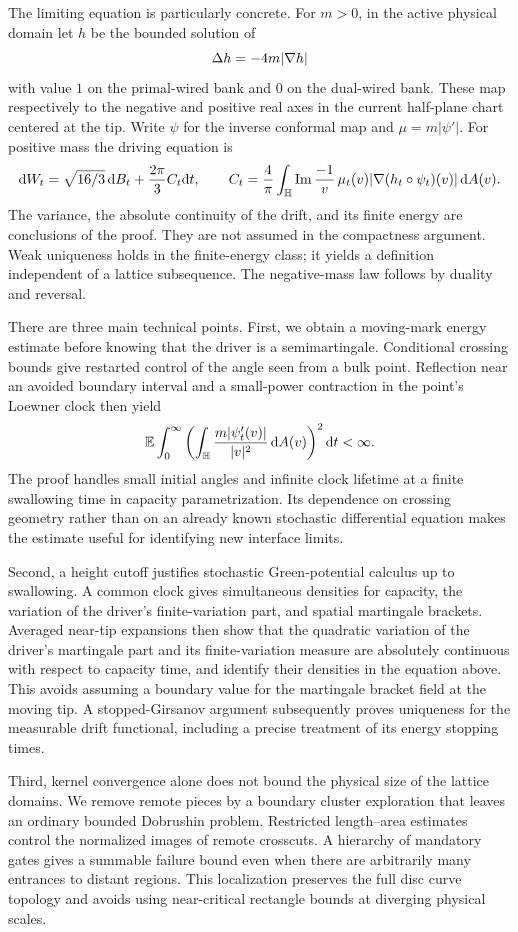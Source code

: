 The limiting equation is particularly concrete. For $m>0$, in the
active physical domain let $h$ be the bounded solution of
\[
 \Delta h=-4m|\nabla h|
\]
with value $1$ on the primal-wired bank and $0$ on the dual-wired
bank. These map respectively to the negative and positive real axes
in the current half-plane chart centered at the tip. Write $\psi$ for the
inverse conformal map and $\mu=m|\psi'|$. For positive mass the
driving equation is
\[
 \mathrm d W_t=\sqrt{16/3}\,\mathrm d B_t+\frac{2\pi}{3}C_t\mathrm d t,
 \qquad
 C_t=\frac4\pi\int_{\mathbb H}\operatorname{Im}\frac{-1}{v}\,
       \mu_t(v)|\nabla(h_t\circ\psi_t)(v)|\,\mathrm d A(v).
\]
The variance, the absolute continuity of the drift, and its finite
energy are conclusions of the proof. They are not assumed in the
compactness argument. Weak uniqueness holds in the finite-energy
class; it yields a definition independent of a lattice subsequence.
The negative-mass law follows by duality and reversal.

There are three main technical points. First, we obtain a
moving-mark energy estimate before knowing that the driver is a
semimartingale. Conditional crossing bounds give restarted control
of the angle seen from a bulk point. Reflection near an avoided
boundary interval and a small-power contraction in the point's
Loewner clock then yield
\[
 \mathbb E\int_0^\infty
   \left(\int_{\mathbb H}\frac{m|\psi_t'(v)|}{|v|^2}\,\mathrm d A(v)\right)^2
   \mathrm d t<\infty.
\]
The proof handles small initial angles and infinite clock lifetime
at a finite swallowing time in capacity parametrization. Its dependence on crossing
geometry rather than on an already known stochastic differential
equation makes the estimate useful for identifying new interface
limits.

Second, a height cutoff justifies stochastic Green-potential
calculus up to swallowing. A common clock gives simultaneous densities for capacity,
the variation of the driver's finite-variation part, and spatial
martingale brackets. Averaged near-tip expansions then show that
the quadratic variation of the driver's martingale part and its
finite-variation measure are absolutely continuous with respect
to capacity time, and identify their densities in the equation above. This avoids assuming a boundary
value for the martingale bracket field at the moving tip. A
stopped-Girsanov argument subsequently proves uniqueness for the
measurable drift functional, including a precise treatment of its
energy stopping times.

Third, kernel convergence alone does not bound the physical size
of the lattice domains. We remove remote pieces by a boundary
cluster exploration that leaves an ordinary bounded Dobrushin
problem. Restricted length--area estimates control the normalized
images of remote crosscuts. A hierarchy of mandatory gates gives
a summable failure bound even when there are arbitrarily many
entrances to distant regions. This localization preserves the full
disc curve topology and avoids using near-critical rectangle
bounds at diverging physical scales.

